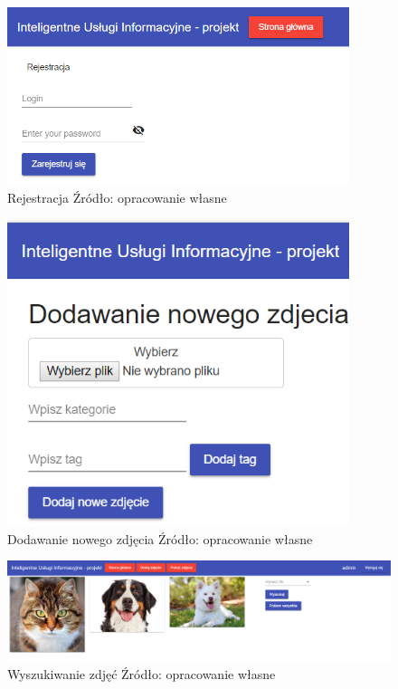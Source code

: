 \begin{figure}
	\centering
	\includegraphics[width = 10cm]{images/rejestracja.png}
	\caption{Rejestracja
		\newline Źródło: opracowanie własne}
	\label{fig:register}
\end{figure}
\begin{figure}
	\centering
	\includegraphics[width = 10cm]{images/nowe_zdjecie.png}
	\caption{Dodawanie nowego zdjęcia
		\newline Źródło: opracowanie własne}
	\label{fig:newPhoto}
\end{figure}
\begin{figure}
	\centering
	\includegraphics[width = 15cm]{images/search.png}
	\caption{Wyszukiwanie zdjęć 
		\newline Źródło: opracowanie własne}
	\label{fig:searchPhoto}
\end{figure}



